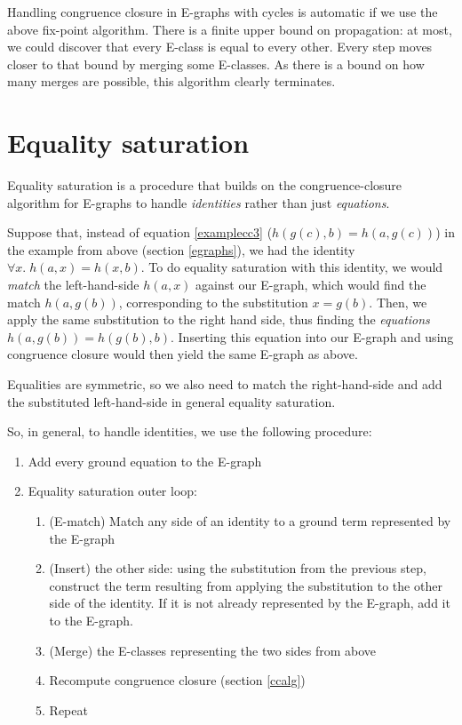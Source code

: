 \documentclass[12pt,a4paper,twoside,openright]{report}
\numberwithin{equation}{chapter}		%
\numberwithin{figure}{chapter}			%
\numberwithin{table}{chapter}			%
\theoremstyle{definition}
\theoremstyle{plain}
\begin{document}
Handling congruence closure in E-graphs with cycles is automatic if we use the above fix-point algorithm. There is a finite upper bound on propagation: at most, we could discover that every E-class is equal to every other. Every step moves closer to that bound by merging some E-classes. As there is a bound on how many merges are possible, this algorithm clearly terminates.

\section{Equality saturation}
Equality saturation is a procedure that builds on the congruence-closure algorithm for E-graphs to handle \emph{identities} rather than just \emph{equations}.

Suppose that, instead of equation \ref{examplecc3} ($h(g(c), b) = h(a, g(c))$) in the example from above (section \ref{egraphs}), we had the identity $\forall x.\; h(a, x) = h(x, b)$. To do equality saturation with this identity, we would \emph{match} the left-hand-side $h(a, x)$ against our E-graph, which would find the match $h(a, g(b))$, corresponding to the substitution $x = g(b)$. Then, we apply the same substitution to the right hand side, thus finding the \emph{equations} $h(a, g(b)) = h(g(b), b)$. Inserting this equation into our E-graph and using congruence closure would then yield the same E-graph as above.

Equalities are symmetric, so we also need to match the right-hand-side and add the substituted left-hand-side in general equality saturation.

So, in general, to handle identities, we use the following procedure:

\begin{enumerate}
\item Add every ground equation to the E-graph
\item Equality saturation outer loop:
	\begin{enumerate}
		\item (E-match) Match any side of an identity to a ground term represented by the E-graph
		\item (Insert) the other side: using the substitution from the previous step, construct the term resulting from applying the substitution to the other side of the identity. If it is not already represented by the E-graph, add it to the E-graph.
		\item (Merge) the E-classes representing the two sides from above
		\item Recompute congruence closure (section \ref{ccalg})
		\item Repeat
	\end{enumerate}
\end{enumerate}
\end{document}
